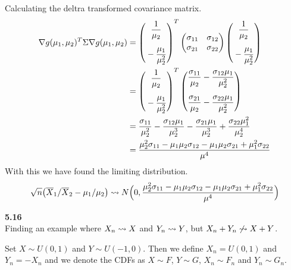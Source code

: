 \newpage\noindent
Calculating the deltra transformed covariance matrix.
\begin{align*}
    \nabla g(\mu_1, \mu_2)^T \Sigma \nabla g(\mu_1, \mu_2)
    &=
    \begin{pmatrix}
        \displaystyle\frac{1}{\mu_2} \\
        \rule{0pt}{21pt}\displaystyle-\frac{\mu_1}{\mu_2^2}
    \end{pmatrix}^T
    \begin{pmatrix}
        \sigma_{11} & \sigma_{12} \\
        \sigma_{21} & \sigma_{22}
    \end{pmatrix}
    \begin{pmatrix}
        \displaystyle\frac{1}{\mu_2} \\
        \rule{0pt}{21pt}\displaystyle-\frac{\mu_1}{\mu_2^2}
    \end{pmatrix} \\
    &=
    \begin{pmatrix}
        \displaystyle\frac{1}{\mu_2} \\
        \rule{0pt}{21pt}\displaystyle-\frac{\mu_1}{\mu_2^2}
    \end{pmatrix}^T
    \begin{pmatrix}
        \displaystyle\frac{\sigma_{11}}{\mu_2} - \frac{\sigma_{12}\mu_1}{\mu_2^2}  \\
        \rule{0pt}{21pt}\displaystyle\frac{\sigma_{21}}{\mu_2} - \frac{\sigma_{22}\mu_1}{\mu_2^2} 
    \end{pmatrix} \\
    &=
    \frac{\sigma_{11}}{\mu_2^2} - \frac{\sigma_{12}\mu_1}{\mu_2^3} - 
    \frac{\sigma_{21}\mu_1}{\mu_2^3} + \frac{\sigma_{22}\mu_1^2}{\mu_2^4} \\
    &= \frac{\mu_2^2\sigma_{11} - \mu_1\mu_2\sigma_{12} - \mu_1\mu_2\sigma_{21} + \mu_1^2\sigma_{22}}{\mu^4}
\end{align*}
With this we have found the limiting distribution.
$$
\sqrt{n}\big(\overline{X}_1/\overline{X}_2 - \mu_1/\mu_2\big)
\rightsquigarrow
N\Big(0, \frac{\mu_2^2\sigma_{11} - \mu_1\mu_2\sigma_{12} - \mu_1\mu_2\sigma_{21} + \mu_1^2\sigma_{22}}{\mu^4}\Big)
$$

\bigskip\noindent
\textbf{5.16}\\  %
Finding an example where $X_n\rightsquigarrow X$ and $Y_n\rightsquigarrow Y$, but $X_n + Y_n \not\rightsquigarrow X + Y$.

\medskip\noindent
Set $X\sim U(0,1)$ and $Y\sim U(-1,0)$. Then we define $X_n = U(0,1)$ and $Y_n = -X_n$
and we denote the CDFs as $X\sim F$, $Y\sim G$, $X_n\sim F_n$ and $Y_n\sim G_n$.

